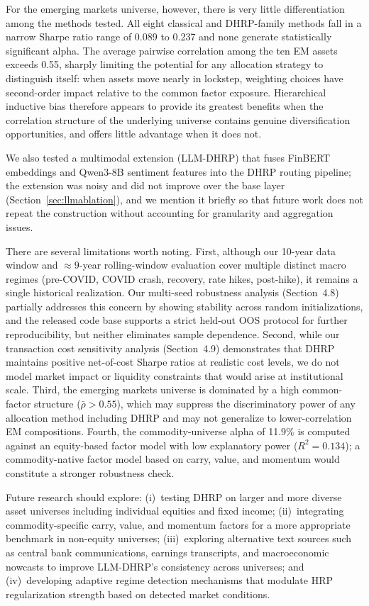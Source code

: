 For the emerging markets universe, however, there is very little differentiation among the methods tested. All eight classical and DHRP-family methods fall in a narrow Sharpe ratio range of 0.089 to 0.237 and none generate statistically significant alpha. The average pairwise correlation among the ten EM assets exceeds 0.55, sharply limiting the potential for any allocation strategy to distinguish itself: when assets move nearly in lockstep, weighting choices have second-order impact relative to the common factor exposure. Hierarchical inductive bias therefore appears to provide its greatest benefits when the correlation structure of the underlying universe contains genuine diversification opportunities, and offers little advantage when it does not.

We also tested a multimodal extension (LLM-DHRP) that fuses FinBERT \citep{Huang2023} embeddings and Qwen3-8B \citep{Qwen2025} sentiment features into the DHRP routing pipeline; the extension was noisy and did not improve over the base layer (Section~\ref{sec:llmablation}), and we mention it briefly so that future work does not repeat the construction without accounting for granularity and aggregation issues.

There are several limitations worth noting. First, although our 10-year data window and $\approx 9$-year rolling-window evaluation cover multiple distinct macro regimes (pre-COVID, COVID crash, recovery, rate hikes, post-hike), it remains a single historical realization. Our multi-seed robustness analysis (Section~4.8) partially addresses this concern by showing stability across random initializations, and the released code base supports a strict held-out OOS protocol for further reproducibility, but neither eliminates sample dependence. Second, while our transaction cost sensitivity analysis (Section~4.9) demonstrates that DHRP maintains positive net-of-cost Sharpe ratios at realistic cost levels, we do not model market impact or liquidity constraints that would arise at institutional scale. Third, the emerging markets universe is dominated by a high common-factor structure ($\bar{\rho} > 0.55$), which may suppress the discriminatory power of any allocation method including DHRP and may not generalize to lower-correlation EM compositions. Fourth, the commodity-universe alpha of 11.9\% is computed against an equity-based factor model with low explanatory power ($R^2 = 0.134$); a commodity-native factor model based on carry, value, and momentum \citep{AsnessMoskowitzPedersen2013} would constitute a stronger robustness check.

Future research should explore: (i)~testing DHRP on larger and more diverse asset universes including individual equities and fixed income; (ii)~integrating commodity-specific carry, value, and momentum factors for a more appropriate benchmark in non-equity universes; (iii)~exploring alternative text sources such as central bank communications, earnings transcripts, and macroeconomic nowcasts to improve LLM-DHRP's consistency across universes; and (iv)~developing adaptive regime detection mechanisms that modulate HRP regularization strength based on detected market conditions.
